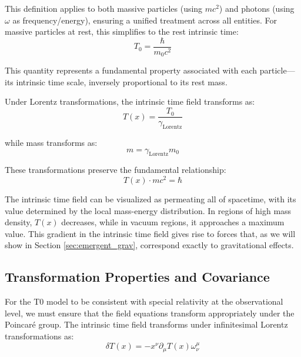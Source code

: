 \documentclass[12pt,a4paper]{article} %
\newcommand{\Tfield}{T(x)}
\newcommand{\Tzero}{T_0}
\newcommand{\gammaf}{\gamma_{\text{Lorentz}}}
\begin{document}
	This definition applies to both massive particles (using $mc^2$)
	and photons (using $\omega$ as frequency/energy),
	ensuring a unified treatment across all entities. 
	For massive particles at rest, this simplifies to the rest intrinsic time:
	\begin{equation}
		\Tzero = \frac{\hbar}{m_0c^2}
		\label{eq:rest_time}
	\end{equation}
	
	This quantity represents a fundamental property associated with each particle—
	its intrinsic time scale, inversely proportional to its rest mass.
	
	Under Lorentz transformations, the intrinsic time field transforms as:
	\begin{equation}
		\Tfield = \frac{\Tzero}{\gammaf}
		\label{eq:time_transform}
	\end{equation}
	
	while mass transforms as:
	\begin{equation}
		m = \gammaf m_0
		\label{eq:mass_transform}
	\end{equation}
	
	These transformations preserve the fundamental relationship:
	\begin{equation}
		\Tfield \cdot mc^2 = \hbar
		\label{eq:invariant}
	\end{equation}
	
	The intrinsic time field can be visualized as permeating all of spacetime,
	with its value determined by the local mass-energy distribution. 
	In regions of high mass density, $\Tfield$ decreases,
	while in vacuum regions, it approaches a maximum value. 
	This gradient in the intrinsic time field gives rise to forces
	that, as we will show in Section \ref{sec:emergent_grav},
	correspond exactly to gravitational effects.
	
	\subsection{Transformation Properties and Covariance}
	\label{subsec:transformations}
	
	For the T0 model to be consistent with special relativity at the observational level,
	we must ensure that the field equations transform appropriately under the Poincaré group. 
	The intrinsic time field transforms under infinitesimal Lorentz transformations as:
	\begin{equation}
		\delta\Tfield = -x^{\nu}\partial_{\mu}\Tfield\omega_{\nu}^{\mu}
		\label{eq:lorentz_transform}
	\end{equation}
	
\end{document}
